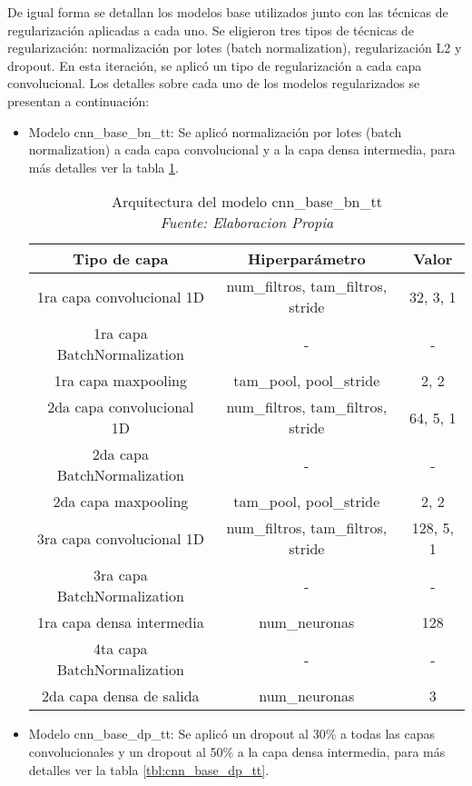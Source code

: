 De igual forma se detallan los modelos base utilizados junto con las técnicas de regularización aplicadas a cada uno. Se eligieron tres tipos de técnicas de regularización: normalización por lotes (batch normalization), regularización L2 y dropout. En esta iteración, se aplicó un tipo de regularización a cada capa convolucional. Los detalles  sobre cada uno de los modelos regularizados se presentan a continuación:

\begin{itemize}
	
	\item Modelo cnn\_base\_bn\_tt: Se aplicó normalización por lotes (batch normalization) a cada capa convolucional y a la capa densa intermedia, para más detalles ver la tabla \ref{tbl:cnn_base_bn_tt}.
	
	\begin{table}[!ht]
		\centering
		\begin{tabular}{|c|c|c|}
			\hline
			\textbf{Tipo de capa} & \textbf{Hiperparámetro} & \textbf{Valor} \\ \hline
			1ra capa convolucional 1D & num\_filtros, tam\_filtros, stride & 32, 3, 1 \\ \hline
			1ra capa BatchNormalization & - & - \\ \hline
			1ra capa maxpooling & tam\_pool, pool\_stride & 2, 2 \\ \hline
			2da capa convolucional 1D & num\_filtros, tam\_filtros, stride & 64, 5, 1 \\ \hline
			2da capa BatchNormalization & - & - \\ \hline
			2da capa maxpooling & tam\_pool, pool\_stride & 2, 2 \\ \hline
			3ra capa convolucional 1D & num\_filtros, tam\_filtros, stride & 128, 5, 1 \\ \hline
			3ra capa BatchNormalization & - & - \\ \hline
			1ra capa densa intermedia & num\_neuronas & 128 \\ \hline
			4ta capa BatchNormalization & - & - \\ \hline
			2da capa densa de salida & num\_neuronas & 3 \\ \hline
		\end{tabular}
		\caption{Arquitectura del modelo cnn\_base\_bn\_tt
			\\\textit{Fuente: Elaboracion Propia}}
		\label{tbl:cnn_base_bn_tt}
	\end{table}
	
	
	\item  Modelo cnn\_base\_dp\_tt: Se aplicó un dropout al 30\% a todas las capas convolucionales y un dropout al 50\% a la capa densa intermedia, para más detalles ver la tabla \ref{tbl:cnn_base_dp_tt}.
	

\end{itemize}
